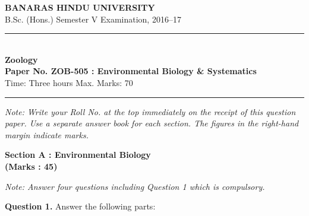 \documentclass[11pt,a4paper]{article}
\begin{document}
\begin{center}
  {\large\bfseries BANARAS HINDU UNIVERSITY}\\[2pt]
  {\normalsize B.Sc. (Hons.) Semester V Examination, 2016--17}\\[6pt]
  \rule{0.8\linewidth}{0.5pt}\\[6pt]
  {\large\bfseries Zoology}\\[4pt]
  {\large\bfseries Paper No. ZOB-505 : Environmental Biology \& Systematics}\\[4pt]
  {\normalsize Time: Three hours \hfill Max. Marks: 70}
\end{center}

\rule{\linewidth}{0.4pt}

\smallskip



\noindent   \textit{Note: Write your Roll No. at the top immediately on the receipt of this question paper. Use a separate answer book for each section. The figures in the right-hand margin indicate marks.}

\bigskip

\begin{center}
   \textbf{Section A : Environmental Biology} \\
   \textbf{(Marks : 45)}
\end{center}

\smallskip



\noindent   \textit{Note: Answer four questions including Question 1 which is compulsory.}

\bigskip



\noindent   \textbf{Question 1.} Answer the following parts:
\end{document}
